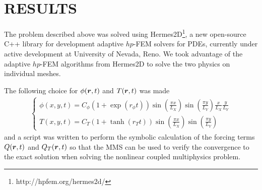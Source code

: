 \section*{RESULTS}
The problem described above was solved using Hermes2D\footnote{http://hpfem.org/hermes2d/}, a new open-source C++ library for development adaptive $hp$-FEM solvers for PDEs, currently under active development at University of Nevada, Reno.  We took advantage of the adaptive $hp$-FEM algorithms \cite{solin2010} from Hermes2D to solve the two physics on individual meshes.


The following choice for $\phi(\boldsymbol{r},t)$ and $T(\boldsymbol{r},t)$ was made
\begin{align}
  \left\{ \begin{array}{l}
      \phi(x,y,t) = C_\phi \left(1+\exp(r_\phi t)\right) \sin\left(\frac{\pi x}{L_X}\right) \sin\left(\frac{\pi y}{L_Y}\right) \frac{x}{L_X} \frac{y}{L_Y} \\
      T(x,y,t) = C_T \left(1+\tanh(r_T t)\right) \sin\left(\frac{\pi x}{L_X}\right) \sin\left(\frac{\pi y}{L_Y}\right)
  \end{array} \right.
\end{align}
and a script was written to perform the symbolic calculation of the forcing terms $Q(\boldsymbol{r},t)$ and $Q_T(\boldsymbol{r},t)$ so that the MMS can be used to verify the convergence to the exact solution when solving the nonlinear coupled multiphysics problem.

